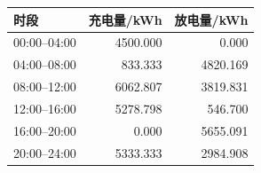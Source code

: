 \begin{tabular}{lrr}
\toprule
时段 & 充电量/kWh & 放电量/kWh \\
\midrule
00:00--04:00 & 4500.000 & 0.000 \\
04:00--08:00 & 833.333 & 4820.169 \\
08:00--12:00 & 6062.807 & 3819.831 \\
12:00--16:00 & 5278.798 & 546.700 \\
16:00--20:00 & 0.000 & 5655.091 \\
20:00--24:00 & 5333.333 & 2984.908 \\
\bottomrule
\end{tabular}
